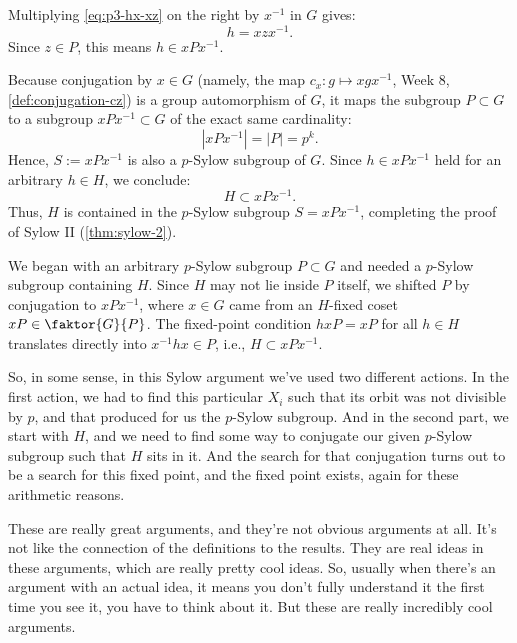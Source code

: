\begin{proofWrapper}
\begin{content}
Multiplying \eqref{eq:p3-hx-xz} on the right by $x^{-1}$ in $G$ gives:
\[
h = x z x^{-1}.
\]
Since $z \in P$, this means $h \in x P x^{-1}$.

Because conjugation by $x \in G$ (namely, the map $c_x \colon g \mapsto x g x^{-1}$, Week 8, \cref{def:conjugation-cz}) is a group automorphism of $G$, it maps the subgroup $P \subset G$ to a subgroup $x P x^{-1} \subset G$ of the exact same cardinality:
\[
|x P x^{-1}| = |P| = p^k.
\]
Hence, $S := x P x^{-1}$ is also a $p$-Sylow subgroup of $G$. Since $h \in x P x^{-1}$ held for an arbitrary $h \in H$, we conclude:
\[
H \subset x P x^{-1}.
\]
Thus, $H$ is contained in the $p$-Sylow subgroup $S = x P x^{-1}$, completing the proof of Sylow II (\cref{thm:sylow-2}).

\begin{steps}
We began with an arbitrary $p$-Sylow subgroup $P \subset G$ and needed a $p$-Sylow subgroup containing $H$. Since $H$ may not lie inside $P$ itself, we shifted $P$ by conjugation to $x P x^{-1}$, where $x \in G$ came from an $H$-fixed coset $x P \in \faktor{G}{P}$. The fixed-point condition $h x P = x P$ for all $h \in H$ translates directly into $x^{-1} h x \in P$, i.e., $H \subset x P x^{-1}$.
\end{steps}
\end{content}

\end{proofWrapper}

\begin{speech}[00:33:27 - 00:34:35]
So, in some sense, in this Sylow argument we've used two different actions. In the first action, we had to find this particular $X_i$ such that its orbit was not divisible by $p$, and that produced for us the $p$-Sylow subgroup. And in the second part, we start with $H$, and we need to find some way to conjugate our given $p$-Sylow subgroup such that $H$ sits in it. And the search for that conjugation turns out to be a search for this fixed point, and the fixed point exists, again for these arithmetic reasons.

These are really great arguments, and they're not obvious arguments at all. It's not like the connection of the definitions to the results. They are real ideas in these arguments, which are really pretty cool ideas. So, usually when there's an argument with an actual idea, it means you don't fully understand it the first time you see it, you have to think about it. But these  are really incredibly cool arguments.
\end{speech}

